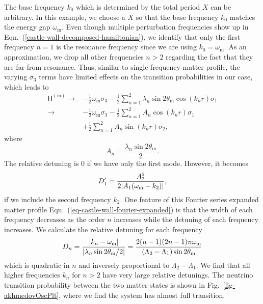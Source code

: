 The base frequency $k_0$ which is determined by the total period $X$ can be arbitrary. In this example, we choose a $X$ so that the base frequency $k_0$ matches the energy gap $\omega_{\mathrm{m}}$. Even though multiple perturbation frequencies show up in Eqn.~(\ref{castle-wall-decomposed-hamiltonian}), we identify that only the first frequency $n=1$ is the resonance frequency since we are using $k_0=\omega_{\mathrm{m}}$. As an approximation, we drop all other frequencies $n>2$ regarding the fact that they are far from resonance. Thus, similar to single frequency matter profile, the varying $\sigma_3$ terms have limited effects on the transition probabilities in our case, which leads to
\begin{align*}
    \mathsf H^{(\mathrm m)} \to & - \frac{1}{2}\omega_{\mathrm m} \sigma_3  - \frac{1}{2} \sum_{n=1}^2\lambda_n \sin 2\theta_{\mathrm m}  \cos\left( k_n r \right) \sigma_1\\
    \to & - \frac{1}{2}\omega_{\mathrm m} \sigma_3  - \frac{1}{2} \sum_{n=1}^2 A_n \cos ( k_n r) \sigma_1 \\
    & + \frac{1}{2} \sum_{n=1}^2A_n \sin(k_n r) \sigma_2,
\end{align*}
where
\begin{equation*}
A_n = \frac{\lambda_n \sin 2\theta_{\mathrm m} }{2} .
\end{equation*}
The relative detuning is $0$ if we have only the first mode. However, it becomes
\begin{equation}
D_1'= \frac{A_2^2}{2\lvert A_1 (\omega_{\mathrm m} - k_2) \rvert},
\end{equation}
if we include the second frequency $k_2$. One feature of this Fourier series expanded matter profile Eqn.~(\ref{eq-castle-wall-fourier-expanded}) is that the width of each frequency decreases as the order $n$ increases while the detuning of each frequency increases. We calculate the relative detuning for each frequency
\begin{equation}
D_n = \frac{\lvert k_n -\omega_{\mathrm m} \rvert}{ \lvert \lambda_n  \sin 2\theta_{\mathrm m}/2 \rvert } = \frac{2(n-1)(2n-1)\pi \omega_{\mathrm m}}{(\Lambda_2 - \Lambda_1)\sin 2\theta_{\mathrm m}}
\end{equation}
which is quadratic in $n$ and inversely proportional to $\Lambda_2-\Lambda_1$. We find that all higher frequencies $k_n$ for $n>2$ have very large relative detunings. The neutrino transition probability between the two matter states is shown in Fig.~\ref{fig-akhmedovOscPlt}, where we find the system has almost full transition.

